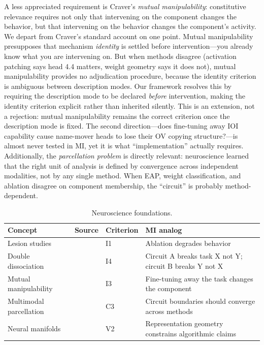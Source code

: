 \documentclass[10pt]{article}
\begin{document}
A less appreciated requirement is Craver's \emph{mutual manipulability}: constitutive relevance requires not only that intervening on the component changes the behavior, but that intervening on the behavior changes the component's activity. We depart from Craver's standard account on one point. Mutual manipulability presupposes that mechanism \emph{identity} is settled before intervention---you already know what you are intervening on. But when methods disagree (activation patching says head 4.4 matters, weight geometry says it does not), mutual manipulability provides no adjudication procedure, because the identity criterion is ambiguous between description modes. Our framework resolves this by requiring the description mode to be declared \emph{before} intervention, making the identity criterion explicit rather than inherited silently. This is an extension, not a rejection: mutual manipulability remains the correct criterion once the description mode is fixed. The second direction---does fine-tuning away IOI capability cause name-mover heads to lose their OV copying structure?---is almost never tested in MI, yet it is what ``implementation'' actually requires. Additionally, the \emph{parcellation problem} is directly relevant: neuroscience learned that the right unit of analysis is defined by convergence across independent modalities, not by any single method. When EAP, weight classification, and ablation disagree on component membership, the ``circuit'' is probably method-dependent.

\begin{table}[H]
\centering\small
\caption{Neuroscience foundations.}
\renewcommand{\arraystretch}{1.12}
\begin{tabular}{@{}l>{\raggedright\arraybackslash}p{2cm}l>{\raggedright\arraybackslash}p{4.5cm}@{}}
\toprule
\textbf{Concept} & \textbf{Source} & \textbf{Criterion} & \textbf{MI analog} \\
\midrule
Lesion studies & \citet{shallice1988neuropsychology} & I1 & Ablation degrades behavior \\
\midrule
Double dissociation & \citet{shallice1988neuropsychology} & I4 & Circuit A breaks task X not Y; circuit B breaks Y not X \\
\midrule
Mutual manipulability & \citet{craver2007explaining} & I3 & Fine-tuning away the task changes the component \\
\midrule
Multimodal parcellation & \citet{glasser2016multi} & C3 & Circuit boundaries should converge across methods \\
\midrule
Neural manifolds & \citet{gallego2017neural} & V2 & Representation geometry constrains algorithmic claims \\
\bottomrule
\end{tabular}
\end{table}
\end{document}
